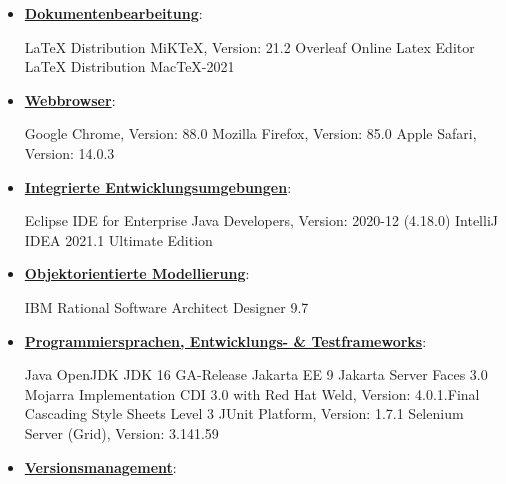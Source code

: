 \documentclass{article}
\begin{document}
\begin{itemize}
\item \underline{\textbf{Dokumentenbearbeitung}}: 
\begin{flushleft}
LaTeX Distribution MiKTeX, Version: 21.2 \linebreak
Overleaf Online Latex Editor \linebreak
LaTeX Distribution MacTeX-2021 \linebreak
\end{flushleft}
\item \underline{\textbf{Webbrowser}}:
\begin{flushleft}
Google Chrome, Version: 88.0 \linebreak
Mozilla Firefox, Version: 85.0 \linebreak
Apple Safari, Version: 14.0.3 \linebreak
\end{flushleft}
\item \underline{\textbf{Integrierte Entwicklungsumgebungen}}: 
\begin{flushleft}
Eclipse IDE for Enterprise Java Developers, Version: 2020-12 (4.18.0) \linebreak
IntelliJ IDEA 2021.1 Ultimate Edition \linebreak
\end{flushleft}
\item \underline{\textbf{Objektorientierte Modellierung}}: 
\begin{flushleft}
IBM Rational Software Architect Designer 9.7 \linebreak
\end{flushleft}
\item \underline{\textbf{Programmiersprachen, Entwicklungs- \& Testframeworks}}: 
\begin{flushleft}
Java OpenJDK JDK 16 GA-Release\linebreak
Jakarta EE 9 \linebreak
Jakarta Server Faces 3.0 Mojarra Implementation \linebreak
CDI 3.0 with Red Hat Weld, Version: 4.0.1.Final \linebreak
Cascading Style Sheets Level 3 \linebreak
JUnit Platform, Version: 1.7.1 \linebreak
Selenium Server (Grid), Version: 3.141.59 \linebreak
\end{flushleft}
\item \underline{\textbf{Versionsmanagement}}:

\end{itemize}
\end{document}
